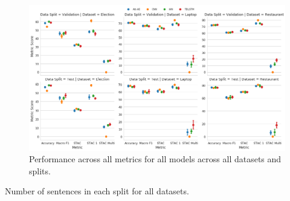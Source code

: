 \begin{figure}[ht!]
    \centering
    \includegraphics[scale=0.32]{images/augmentation/methods_performance/baseline/baseline_stac_scores.png}
    \caption{Performance across all metrics for all models across all datasets and splits.}
    \label{fig:baseline_stac_scores.png}
\end{figure}

\begin{table}[ht!]
    \centering
    
    \caption{Number of sentences in each split for all datasets.}
    \label{tab:aug_STAC_samples_stats}
\end{table}


